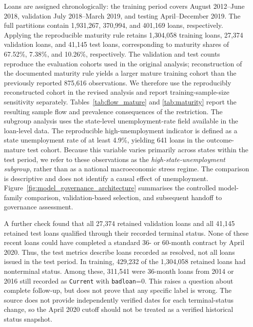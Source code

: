 \documentclass[10pt]{article}
\begin{document}
Loans are assigned chronologically: the training period covers August 2012--June 2018, validation July 2018--March 2019, and testing April--December 2019. The full partitions contain 1,931,267, 370,994, and 401,169 loans, respectively. Applying the reproducible maturity rule retains 1,304,058 training loans, 27,374 validation loans, and 41,145 test loans, corresponding to maturity shares of 67.52\%, 7.38\%, and 10.26\%, respectively. The validation and test counts reproduce the evaluation cohorts used in the original analysis; reconstruction of the documented maturity rule yields a larger mature training cohort than the previously reported 875,616 observations. We therefore use the reproducibly reconstructed cohort in the revised analysis and report training-sample-size sensitivity separately. Tables~\ref{tab:flow_mature} and \ref{tab:maturity} report the resulting sample flow and prevalence consequences of the restriction. The subgroup analysis uses the state-level unemployment-rate field available in the loan-level data. The reproducible high-unemployment indicator is defined as a state unemployment rate of at least 4.9\%, yielding 641 loans in the outcome-mature test cohort. Because this variable varies primarily across states within the test period, we refer to these observations as the \emph{high-state-unemployment subgroup}, rather than as a national macroeconomic stress regime. The comparison is descriptive and does not identify a causal effect of unemployment. Figure~\ref{fig:model_governance_architecture} summarises the controlled model-family comparison, validation-based selection, and subsequent handoff to governance assessment.

A further check found that all 27,374 retained validation loans and all 41,145 retained test loans qualified through their recorded terminal status. None of these recent loans could have completed a standard 36- or 60-month contract by April 2020. Thus, the test metrics describe loans recorded as resolved, not all loans issued in the test period. In training, 429,232 of the 1,304,058 retained loans had nonterminal status. Among these, 311,541 were 36-month loans from 2014 or 2016 still recorded as \texttt{Current} with \texttt{badloan}=0. This raises a question about complete follow-up, but does not prove that any specific label is wrong. The source does not provide independently verified dates for each terminal-status change, so the April 2020 cutoff should not be treated as a verified historical status snapshot.
\end{document}
